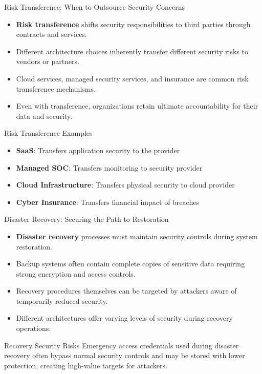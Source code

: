 \documentclass{beamer}
\begin{document}
        \begin{frame}{Risk Transference: When to Outsource Security Concerns}
            \begin{itemize}
            \item \textbf{Risk transference} shifts security responsibilities to third parties through contracts and services.
            \item Different architecture choices inherently transfer different security risks to vendors or partners.
            \item Cloud services, managed security services, and insurance are common risk transference mechanisms.
            \item Even with transference, organizations retain ultimate accountability for their data and security.
            \end{itemize}
            
            \begin{exampleblock}{Risk Transference Examples}
            \begin{itemize}
            \item \textbf{SaaS}: Transfers application security to the provider
            \item \textbf{Managed SOC}: Transfers monitoring to security provider
            \item \textbf{Cloud Infrastructure}: Transfers physical security to cloud provider
            \item \textbf{Cyber Insurance}: Transfers financial impact of breaches
            \end{itemize}
            \end{exampleblock}
            \end{frame}
            
            \begin{frame}{Disaster Recovery: Securing the Path to Restoration}
            \begin{itemize}
            \item \textbf{Disaster recovery} processes must maintain security controls during system restoration.
            \item Backup systems often contain complete copies of sensitive data requiring strong encryption and access controls.
            \item Recovery procedures themselves can be targeted by attackers aware of temporarily reduced security.
            \item Different architectures offer varying levels of security during recovery operations.
            \end{itemize}
            
            \begin{alertblock}{Recovery Security Risks}
            Emergency access credentials used during disaster recovery often bypass normal security controls and may be stored with lower protection, creating high-value targets for attackers.
            \end{alertblock}
            \end{frame}
            
\end{document}
